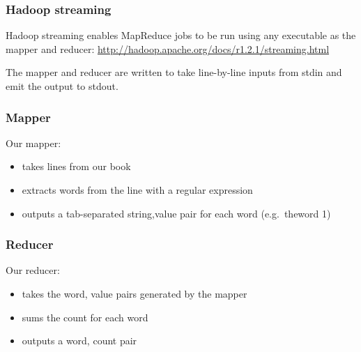 \subsubsection{Hadoop streaming}\label{hadoop-streaming}

Hadoop streaming enables MapReduce jobs to be run using any executable
as the mapper and reducer:
\url{http://hadoop.apache.org/docs/r1.2.1/streaming.html}

The mapper and reducer are written to take line-by-line inputs from
stdin and emit the output to stdout.

\subsubsection{Mapper}\label{mapper}

Our mapper:

\begin{itemize}
\itemsep1pt\parskip0pt
\item
  takes lines from our book
\item
  extracts words from the line with a regular expression
\item
  outputs a tab-separated string,value pair for each word (e.g.~theword
  1)
\end{itemize}

\begin{Shaded}
\begin{Highlighting}[]
 
 

 
    \NormalTok{(}\NormalTok{)}
     
         
              \NormalTok{+ }

\end{Highlighting}
\end{Shaded}

\subsubsection{Reducer}\label{reducer}

Our reducer:

\begin{itemize}
\itemsep1pt\parskip0pt
\item
  takes the word, value pairs generated by the mapper
\item
  sums the count for each word
\item
  outputs a word, count pair
\end{itemize}

